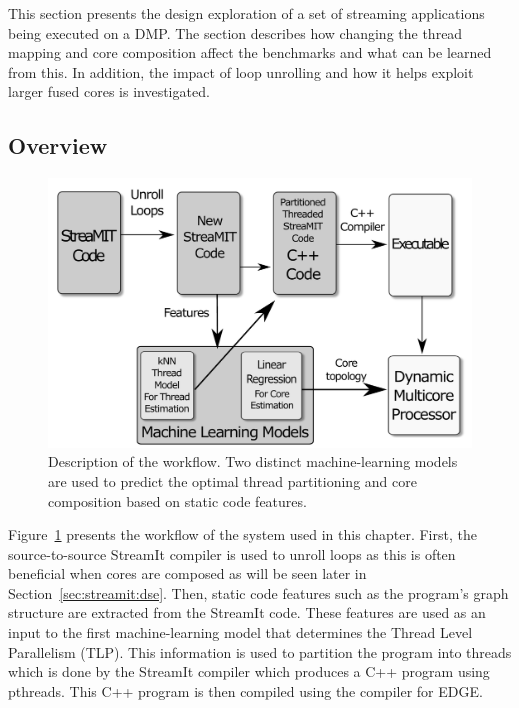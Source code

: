 This section presents the design exploration of a set of streaming applications being executed on a DMP.
The section describes how changing the thread mapping and core composition affect the benchmarks and what can be learned from this.
In addition, the impact of loop unrolling and how it helps exploit larger fused cores is investigated.

\subsection{Overview}

\begin{figure}
    \centering
    \includegraphics[width=1\textwidth]{streamit-paper/graphics/explanation.pdf}
    \caption{Description of the workflow.
    Two distinct machine-learning models are used to predict the optimal thread partitioning and core composition based on static code features.}
    \label{fig:overview}
\end{figure}

Figure~\ref{fig:overview} presents the workflow of the system used in this chapter.
First, the source-to-source StreamIt compiler is used to unroll loops as this is often beneficial when cores are composed as will be seen later in Section~\ref{sec:streamit:dse}.
Then, static code features such as the program's graph structure are extracted from the StreamIt code.
These features are used as an input to the first machine-learning model that determines the Thread Level Parallelism (TLP).
This information is used to partition the program into threads which is done by the StreamIt compiler which produces a C++ program using pthreads.
This C++ program is then compiled using the compiler for EDGE.

